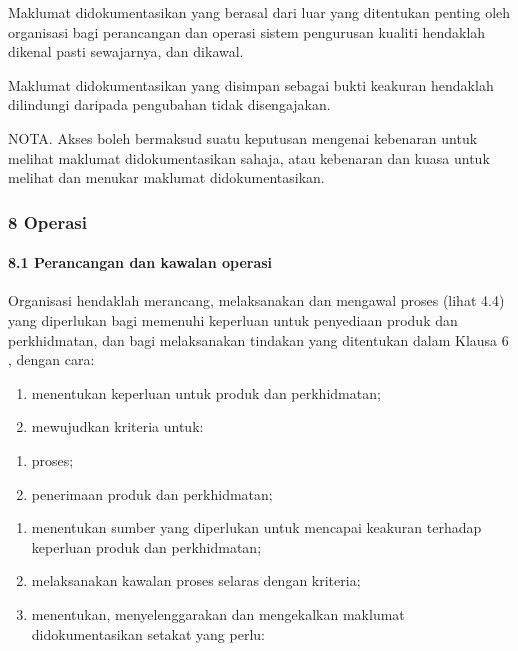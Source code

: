 \documentclass[
]{article}
\begin{document}
Maklumat didokumentasikan yang berasal dari luar yang ditentukan penting
oleh organisasi bagi perancangan dan operasi sistem pengurusan kualiti
hendaklah dikenal pasti sewajarnya, dan dikawal.

Maklumat didokumentasikan yang disimpan sebagai bukti keakuran hendaklah
dilindungi daripada pengubahan tidak disengajakan.

NOTA. Akses boleh bermaksud suatu keputusan mengenai kebenaran untuk
melihat maklumat didokumentasikan sahaja, atau kebenaran dan kuasa untuk
melihat dan menukar maklumat didokumentasikan.

\hypertarget{operasi}{%
\subsubsection{8 Operasi}\label{operasi}}

\hypertarget{perancangan-dan-kawalan-operasi}{%
\paragraph{8.1 Perancangan dan kawalan
operasi}\label{perancangan-dan-kawalan-operasi}}

Organisasi hendaklah merancang, melaksanakan dan mengawal proses (lihat
4.4) yang diperlukan bagi memenuhi keperluan untuk penyediaan produk dan
perkhidmatan, dan bagi melaksanakan tindakan yang ditentukan dalam
Klausa 6 , dengan cara:

\begin{enumerate}
\def\labelenumi{\alph{enumi})}
\item
  menentukan keperluan untuk produk dan perkhidmatan;
\item
  mewujudkan kriteria untuk:
\end{enumerate}

\begin{enumerate}
\def\labelenumi{\arabic{enumi})}
\item
  proses;
\item
  penerimaan produk dan perkhidmatan;
\end{enumerate}

\begin{enumerate}
\def\labelenumi{\alph{enumi})}
\setcounter{enumi}{2}
\item
  menentukan sumber yang diperlukan untuk mencapai keakuran terhadap
  keperluan produk dan perkhidmatan;
\item
  melaksanakan kawalan proses selaras dengan kriteria;
\item
  menentukan, menyelenggarakan dan mengekalkan maklumat didokumentasikan
  setakat yang perlu:
\end{enumerate}
\end{document}
